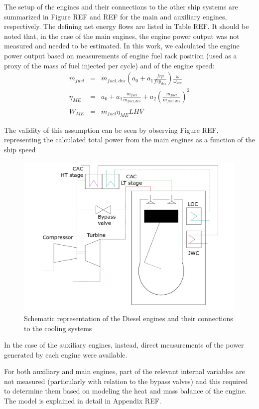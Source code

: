 \documentclass[preprint,12pt]{elsarticle}
\begin{document}
The setup of the engines and their connections to the other ship systems are summarized in Figure REF and REF for the main and auxiliary engines, respectively. The defining net energy flows are listed in Table REF. It should be noted that, in the case of the main engines, the engine power output was not measured and needed to be estimated. In this work, we calculated the engine power output based on measurements of engine fuel rack position (used as a proxy of the mass of fuel injected per cycle) and of the engine speed:
\begin{eqnarray}
\dot{m}_{fuel} & = & \dot{m}_{fuel,des} \left(a_0 + a_1 \frac{frp}{frp_{des}}\right) \frac{\omega}{\omega_{des}} \\
\eta_{ME} & = & a_0 + a_1 \frac{\dot{m}_{fuel}}{\dot{m}_{fuel,des}} + a_2 \left( \frac{\dot{m}_{fuel}}{\dot{m}_{fuel,des}} \right)^2 \\
\dot{W}_{ME} & = & \dot{m}_{fuel} \eta_{ME} LHV
\end{eqnarray}

The validity of this assumption can be seen by observing Figure REF, representing the calculated total power from the main engines as a function of the ship speed

\begin{figure}
	\centering
	\includegraphics[width=0.9\linewidth]{Figures/DieselEngines}
	\caption{Schematic representation of the Diesel engines and their connections to the cooling systems}
	\label{fig:DieselEngines}
\end{figure}

In the case of the auxiliary engines, instead, direct measurements of the power generated by each engine were available. 

For both auxiliary and main engines, part of the relevant internal variables are not measured (particularly with relation to the bypass valves) and this required to determine them based on modeling the heat and mass balance of the engine. The model is explained in detail in Appendix REF.
\end{document}
